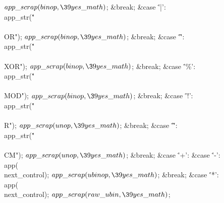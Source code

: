 ${}\\{app\_scrap}(\\{binop},\39\\{yes\_math}){}$;\5
\&{break};\6
\4\&{case} \.{'|'}:\5
\\{app\_str}(\.{"\\\\OR"});\5
${}\\{app\_scrap}(\\{binop},\39\\{yes\_math}){}$;\5
\&{break};\6
\4\&{case} \.{'\^'}:\5
\\{app\_str}(\.{"\\\\XOR"});\5
${}\\{app\_scrap}(\\{binop},\39\\{yes\_math}){}$;\5
\&{break};\6
\4\&{case} \.{'\%'}:\5
\\{app\_str}(\.{"\\\\MOD"});\5
${}\\{app\_scrap}(\\{binop},\39\\{yes\_math}){}$;\5
\&{break};\6
\4\&{case} \.{'!'}:\5
\\{app\_str}(\.{"\\\\R"});\5
${}\\{app\_scrap}(\\{unop},\39\\{yes\_math}){}$;\5
\&{break};\6
\4\&{case} \.{'\~'}:\5
\\{app\_str}(\.{"\\\\CM"});\5
${}\\{app\_scrap}(\\{unop},\39\\{yes\_math}){}$;\5
\&{break};\6
\4\&{case} \.{'+'}:\5
\&{case} \.{'-'}:\5
\\{app}(\\{next\_control});\5
${}\\{app\_scrap}(\\{ubinop},\39\\{yes\_math}){}$;\5
\&{break};\6
\4\&{case} \.{'*'}:\5
\\{app}(\\{next\_control});\5
${}\\{app\_scrap}(\\{raw\_ubin},\39\\{yes\_math}){}$;\5
